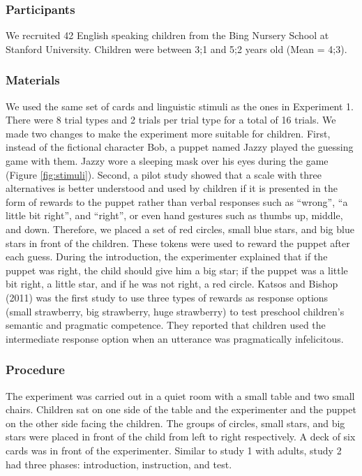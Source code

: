 \documentclass[,man,floatsintext]{apa6}
\begin{document}
\hypertarget{participants-1}{%
\subsubsection{Participants}\label{participants-1}}

We recruited 42 English speaking children from the Bing Nursery School at Stanford University. Children were between 3;1 and 5;2 years old (Mean = 4;3).

\hypertarget{materials}{%
\subsubsection{Materials}\label{materials}}

We used the same set of cards and linguistic stimuli as the ones in Experiment 1. There were 8 trial types and 2 trials per trial type for a total of 16 trials. We made two changes to make the experiment more suitable for children. First, instead of the fictional character Bob, a puppet named Jazzy played the guessing game with them. Jazzy wore a sleeping mask over his eyes during the game (Figure \ref{fig:stimuli}). Second, a pilot study showed that a scale with three alternatives is better understood and used by children if it is presented in the form of rewards to the puppet rather than verbal responses such as \enquote{wrong}, \enquote{a little bit right}, and \enquote{right}, or even hand gestures such as thumbs up, middle, and down. Therefore, we placed a set of red circles, small blue stars, and big blue stars in front of the children. These tokens were used to reward the puppet after each guess. During the introduction, the experimenter explained that if the puppet was right, the child should give him a big star; if the puppet was a little bit right, a little star, and if he was not right, a red circle. Katsos and Bishop (2011) was the first study to use three types of rewards as response options (small strawberry, big strawberry, huge strawberry) to test preschool children's semantic and pragmatic competence. They reported that children used the intermediate response option when an utterance was pragmatically infelicitous.

\hypertarget{procedure-1}{%
\subsubsection{Procedure}\label{procedure-1}}

The experiment was carried out in a quiet room with a small table and two small chairs. Children sat on one side of the table and the experimenter and the puppet on the other side facing the children. The groups of circles, small stars, and big stars were placed in front of the child from left to right respectively. A deck of six cards was in front of the experimenter. Similar to study 1 with adults, study 2 had three phases: introduction, instruction, and test.
\end{document}
